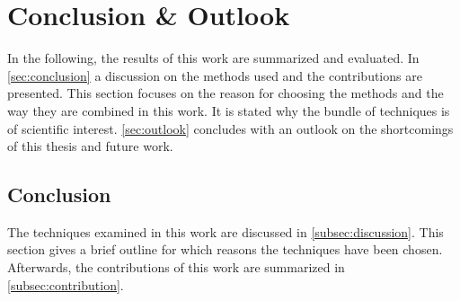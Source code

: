 \chapter{Conclusion \& Outlook}\label{ch:conclusion-outlook}

In the following, the results of this work are summarized and evaluated.
In \autoref{sec:conclusion} a discussion on the methods used and the contributions are presented.
This section focuses on the reason for choosing the methods and the way they are combined in this work.
It is stated why the bundle of techniques is of scientific interest.
\autoref{sec:outlook} concludes with an outlook on the shortcomings of this thesis and future work.

\section{Conclusion}\label{sec:conclusion}

The techniques examined in this work are discussed in \autoref{subsec:discussion}.
This section gives a brief outline for which reasons the techniques have been chosen.
Afterwards, the contributions of this work are summarized in \autoref{subsec:contribution}.








